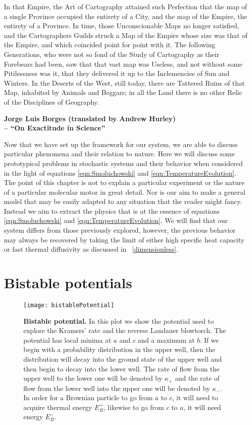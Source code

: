 \setlength{}
\epigraph{In that Empire, the Art of Cartography attained such Perfection that the map of a single Province occupied the entirety of a City, and the map of the Empire, the entirety of a Province. In time, those Unconscionable Maps no longer satisfied, and the Cartographers Guilds struck a Map of the Empire whose size was that of the Empire, and which coincided point for point with it. The following Generations, who were not so fond of the Study of Cartography as their Forebears had been, saw that that vast map was Useless, and not without some Pitilessness was it, that they delivered it up to the Inclemencies of Sun and Winters. In the Deserts of the West, still today, there are Tattered Ruins of that Map, inhabited by Animals and Beggars; in all the Land there is no other Relic of the Disciplines of Geography.}{\textbf{Jorge Luis Borges (translated by Andrew Hurley) \\ -- ``On Exactitude in Science''}}

Now that we have set up the framework for our system, we are able to discuss particular phenomena and their relation to nature. Here we will discuss some prototypical problems in stochastic systems and their behavior when considered in the light of equations \ref{eqn:Smoluchowski} and \ref{eqn:TemperatureEvolution}. The point of this chapter is not to explain a particular experiment or the nature of a particular molecular motor in great detail. Nor is our aim to make a general model that may be easily adapted to any situation that the reader might fancy. Instead we aim to extract the physics that is at the essence of equations \ref{eqn:Smoluchowski} and \ref{eqn:TemperatureEvolution}. We will find that our system differs from those previously explored, however, the previous behavior may always be recovered by taking the limit of either high specific heat capacity or fast thermal diffusivity as discussed in ~\autoref{dimensionless}.

\section{Bistable potentials} \label{Kramers}

\begin{figure}[tb]
\texttt{[image: bistablePotential]}
\caption{\textbf{Bistable potential.} In this plot we show the potential used to explore the Kramers' rate and the reverse Landauer blowtorch. The potential has local minima at $a$ and $c$ and a maximum at $b$. If we begin with a probability distribution in the upper well, then the distribution will decay into the ground state of the upper well and then begin to decay into the lower well. The rate of flow from the upper well to the lower one will be denoted by $\kappa_+$ and the rate of flow from the lower well into the upper one will be denoted by $\kappa_-$. In order for a Brownian particle to go from $a$ to $c$, it will need to acquire thermal energy $E_B^+$, likewise to go from $c$ to $a$, it will need energy $E_B^-$.}
\label{fig:bistablePotential}
\end{figure}

